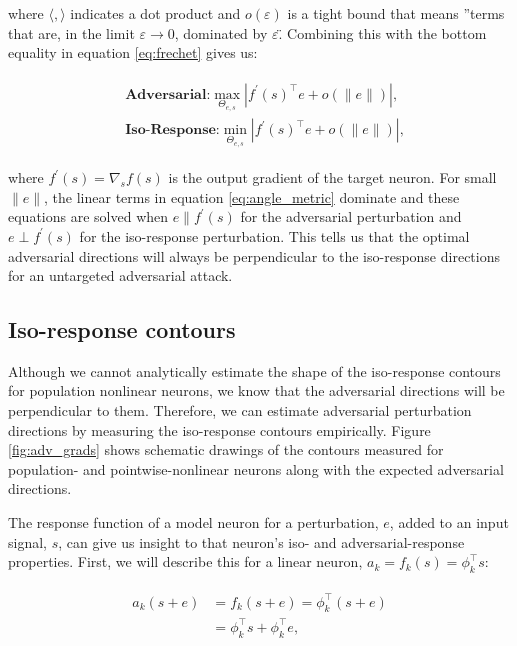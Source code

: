 where $\langle , \rangle$ indicates a dot product and $o(\varepsilon)$ is a tight bound that means ''terms that are, in the limit $\varepsilon \rightarrow 0$, dominated by $\varepsilon$\". Combining this with the bottom equality in equation \ref{eq:frechet} gives us:

\begin{align}\label{eq:angle_metric}
\begin{split}
    &\textbf{Adversarial:} \max_{\Theta_{e,s}} |f^{\prime}(s)^\top e + o(\|e\|)|,\\
    &\textbf{Iso-Response:} \min_{\Theta_{e,s}} |f^{\prime}(s)^\top e + o(\|e\|)|,
\end{split}
\end{align}

where $f^{\prime}(s) = \nabla_{s}f(s)$ is the output gradient of the target neuron. For small $\|e\|$, the linear terms in equation \ref{eq:angle_metric} dominate and these equations are solved when $e \parallel f^{\prime}(s)$ for the adversarial perturbation and $e \perp f^{\prime}(s)$ for the iso-response perturbation. This tells us that the optimal adversarial directions will always be perpendicular to the iso-response directions for an untargeted adversarial attack. 

\subsection{Iso-response contours}
Although we cannot analytically estimate the shape of the iso-response contours for population nonlinear neurons, we know that the adversarial directions will be perpendicular to them. Therefore, we can estimate adversarial perturbation directions by measuring the iso-response contours empirically. Figure \ref{fig:adv_grads} shows schematic drawings of the contours measured for population- and pointwise-nonlinear neurons along with the expected adversarial directions.

The response function of a model neuron for a perturbation, $e$, added to an input signal, $s$, can give us insight to that neuron's iso- and adversarial-response properties. First, we will describe this for a linear neuron, $a_{k}=f_{k}(s)=\phi_{k}^\top s$:

\begin{align}\label{eq:linear_neuron}
\begin{split}
    a_{k}(s+e) &= f_{k}(s+e) = \phi_{k}^\top (s + e) \\
    &= \phi_{k}^\top s +\phi_{k}^\top e,
\end{split}
\end{align}

